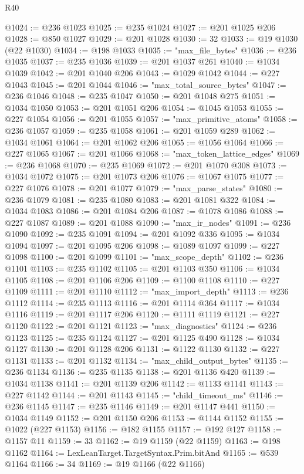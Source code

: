 \begin{lexlean}{R40}
\begin{coremodule}
@1024 := @236 @1023
@1025 := @235 @1024
@1027 := @201 @1025 @206
@1028 := @850 @1027
@1029 := @201 @1028
@1030 := 32
@1033 := @19 @1030 (@22 @1030)
@1034 := @198 @1033
@1035 := "max_file_bytes"
@1036 := @236 @1035
@1037 := @235 @1036
@1039 := @201 @1037 @261
@1040 := @1034 @1039
@1042 := @201 @1040 @206
@1043 := @1029 @1042
@1044 := @227 @1043
@1045 := @201 @1044
@1046 := "max_total_source_bytes"
@1047 := @236 @1046
@1048 := @235 @1047
@1050 := @201 @1048 @275
@1051 := @1034 @1050
@1053 := @201 @1051 @206
@1054 := @1045 @1053
@1055 := @227 @1054
@1056 := @201 @1055
@1057 := "max_primitive_atoms"
@1058 := @236 @1057
@1059 := @235 @1058
@1061 := @201 @1059 @289
@1062 := @1034 @1061
@1064 := @201 @1062 @206
@1065 := @1056 @1064
@1066 := @227 @1065
@1067 := @201 @1066
@1068 := "max_token_lattice_edges"
@1069 := @236 @1068
@1070 := @235 @1069
@1072 := @201 @1070 @308
@1073 := @1034 @1072
@1075 := @201 @1073 @206
@1076 := @1067 @1075
@1077 := @227 @1076
@1078 := @201 @1077
@1079 := "max_parse_states"
@1080 := @236 @1079
@1081 := @235 @1080
@1083 := @201 @1081 @322
@1084 := @1034 @1083
@1086 := @201 @1084 @206
@1087 := @1078 @1086
@1088 := @227 @1087
@1089 := @201 @1088
@1090 := "max_ir_nodes"
@1091 := @236 @1090
@1092 := @235 @1091
@1094 := @201 @1092 @336
@1095 := @1034 @1094
@1097 := @201 @1095 @206
@1098 := @1089 @1097
@1099 := @227 @1098
@1100 := @201 @1099
@1101 := "max_scope_depth"
@1102 := @236 @1101
@1103 := @235 @1102
@1105 := @201 @1103 @350
@1106 := @1034 @1105
@1108 := @201 @1106 @206
@1109 := @1100 @1108
@1110 := @227 @1109
@1111 := @201 @1110
@1112 := "max_import_depth"
@1113 := @236 @1112
@1114 := @235 @1113
@1116 := @201 @1114 @364
@1117 := @1034 @1116
@1119 := @201 @1117 @206
@1120 := @1111 @1119
@1121 := @227 @1120
@1122 := @201 @1121
@1123 := "max_diagnostics"
@1124 := @236 @1123
@1125 := @235 @1124
@1127 := @201 @1125 @490
@1128 := @1034 @1127
@1130 := @201 @1128 @206
@1131 := @1122 @1130
@1132 := @227 @1131
@1133 := @201 @1132
@1134 := "max_child_output_bytes"
@1135 := @236 @1134
@1136 := @235 @1135
@1138 := @201 @1136 @420
@1139 := @1034 @1138
@1141 := @201 @1139 @206
@1142 := @1133 @1141
@1143 := @227 @1142
@1144 := @201 @1143
@1145 := "child_timeout_ms"
@1146 := @236 @1145
@1147 := @235 @1146
@1149 := @201 @1147 @441
@1150 := @1034 @1149
@1152 := @201 @1150 @206
@1153 := @1144 @1152
@1155 := @1022 (@227 @1153)
@1156 := @182 @1155
@1157 := @192 @127
@1158 := @1157 @11
@1159 := 33
@1162 := @19 @1159 (@22 @1159)
@1163 := @198 @1162
@1164 := LexLeanTarget.TargetSyntax.Prim.bitAnd
@1165 := @539 @1164
@1166 := 34
@1169 := @19 @1166 (@22 @1166)

\end{coremodule}
\end{lexlean}
